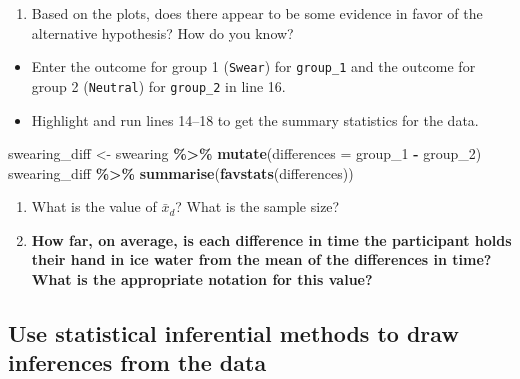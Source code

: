 \documentclass[
]{report}
\newenvironment{Shaded}{\begin{snugshade}}{\end{snugshade}}
\newcommand{\AttributeTok}[1]{\textcolor[rgb]{0.13,0.29,0.53}{#1}}
\newcommand{\FunctionTok}[1]{\textcolor[rgb]{0.13,0.29,0.53}{\textbf{#1}}}
\newcommand{\NormalTok}[1]{#1}
\newcommand{\OtherTok}[1]{\textcolor[rgb]{0.56,0.35,0.01}{#1}}
\newcommand{\SpecialCharTok}[1]{\textcolor[rgb]{0.81,0.36,0.00}{\textbf{#1}}}
\providecommand{\tightlist}{%
  \setlength{\itemsep}{0pt}\setlength{\parskip}{0pt}}
\begin{document}
\begin{enumerate}
\def\labelenumi{\arabic{enumi}.}
\setcounter{enumi}{4}
\tightlist
\item
  Based on the plots, does there appear to be some evidence in favor of the alternative hypothesis? How do you know?
  \vspace{0.4in}
\end{enumerate}

\begin{itemize}
\item
  Enter the outcome for group 1 (\texttt{Swear}) for \texttt{group\_1} and the outcome for group 2 (\texttt{Neutral}) for \texttt{group\_2} in line 16.
\item
  Highlight and run lines 14--18 to get the summary statistics for the data.
\end{itemize}

\begin{Shaded}
\begin{Highlighting}[]
\NormalTok{swearing\_diff }\OtherTok{\textless{}{-}}\NormalTok{ swearing }\SpecialCharTok{\%\textgreater{}\%} 
  \FunctionTok{mutate}\NormalTok{(}\AttributeTok{differences =}\NormalTok{ group\_1 }\SpecialCharTok{{-}}\NormalTok{ group\_2)}
\NormalTok{swearing\_diff }\SpecialCharTok{\%\textgreater{}\%} 
    \FunctionTok{summarise}\NormalTok{(}\FunctionTok{favstats}\NormalTok{(differences))}
\end{Highlighting}
\end{Shaded}

\begin{enumerate}
\def\labelenumi{\arabic{enumi}.}
\setcounter{enumi}{5}
\item
  What is the value of \(\bar{x}_d\)? What is the sample size?
  \vspace{0.25in}
\item
  \textbf{How far, on average, is each difference in time the participant holds their hand in ice water from the mean of the differences in time? What is the appropriate notation for this value?}
\end{enumerate}

\vspace{0.4in}

\hypertarget{use-statistical-inferential-methods-to-draw-inferences-from-the-data-2}{%
\subsection*{Use statistical inferential methods to draw inferences from the data}\label{use-statistical-inferential-methods-to-draw-inferences-from-the-data-2}}
\end{document}
